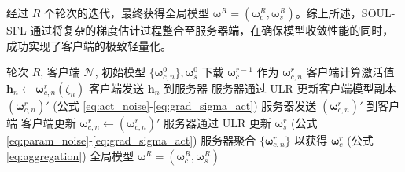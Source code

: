 经过 $R$ 个轮次的迭代，最终获得全局模型 $\boldsymbol{\omega}^R = (\boldsymbol{\omega}_c^R, \boldsymbol{\omega}_s^R)$。综上所述，SOUL-SFL 通过将复杂的梯度估计过程整合至服务器端，在确保模型收敛性能的同时，成功实现了客户端的极致轻量化。
\begin{algorithm}[t]
\caption{SOUL-SFL 算法流程}
\label{alg:soul-sfl}
\begin{algorithmic}[1]
\REQUIRE 轮次 $R$, 客户端 $\mathcal{N}$, 初始模型 $\{\boldsymbol{\omega}_{c,n}^0\}, \boldsymbol{\omega}_s^0$
        \STATE 下载 $\boldsymbol{\omega}_c^{r-1}$ 作为 $\boldsymbol{\omega}_{c,n}^r$
                \STATE 客户端计算激活值 $\mathbf{h}_n \leftarrow \boldsymbol{\omega}_{c,n}^r(\zeta_n)$
                \STATE 客户端发送 $\mathbf{h}_n$ 到服务器
                \STATE 服务器通过 ULR 更新客户端模型副本 $(\boldsymbol{\omega}_{c,n}^{r})'$ (公式 \ref{eq:act_noise}-\ref{eq:grad_sigma_act})
                \STATE 服务器发送 $(\boldsymbol{\omega}_{c,n}^{r})'$ 到客户端
                \STATE 客户端更新 $\boldsymbol{\omega}_{c,n}^r \leftarrow (\boldsymbol{\omega}_{c,n}^{r})'$
                \STATE 服务器通过 ULR 更新 $\boldsymbol{\omega}_s^r$ (公式 \ref{eq:param_noise}-\ref{eq:grad_sigma_act})
            \ENDFOR
        \ENDFOR
    \ENDFOR
    \STATE 服务器聚合 $\{\boldsymbol{\omega}_{c,n}^r\}$ 以获得 $\boldsymbol{\omega}_c^r$ (公式 \ref{eq:aggregation})
\ENDFOR
\RETURN 全局模型 $\boldsymbol{\omega}^R = (\boldsymbol{\omega}_c^R, \boldsymbol{\omega}_s^R)$
\end{algorithmic}
\end{algorithm}

